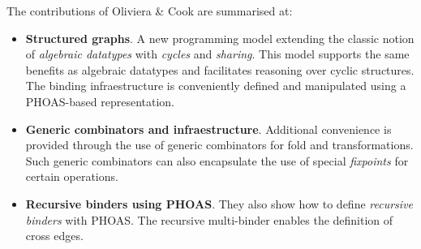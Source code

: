 
The contributions of Oliviera \& Cook are summarised at:

\begin{itemize}
  \item \textbf{Structured graphs}. A new programming model extending the classic notion of \emph{algebraic datatypes} with \emph{cycles} and \emph{sharing}. This model supports the same benefits as algebraic datatypes and facilitates reasoning over cyclic structures. The binding infraestructure is conveniently defined and manipulated using a PHOAS-based representation.
  \item \textbf{Generic combinators and infraestructure}. Additional convenience is provided through the use of generic combinators for fold and transformations. Such generic combinators can also encapsulate the use of special \emph{fixpoints} for certain operations.
  \item \textbf{Recursive binders using PHOAS}. They also show how to define \emph{recursive binders} with PHOAS. The recursive multi-binder enables the definition of cross edges.
\end{itemize}

